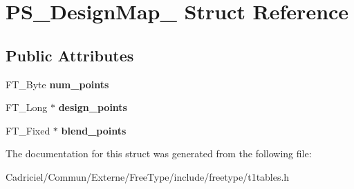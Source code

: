 \hypertarget{struct_p_s___design_map__}{\section{P\-S\-\_\-\-Design\-Map\-\_\- Struct Reference}
\label{struct_p_s___design_map__}
}
\subsection*{Public Attributes}
\begin{DoxyCompactItemize}
\item 
\hypertarget{struct_p_s___design_map___a505a70dd0f497f177fffca9bc4e5d0a5}{F\-T\-\_\-\-Byte {\bfseries num\-\_\-points}}\label{struct_p_s___design_map___a505a70dd0f497f177fffca9bc4e5d0a5}

\item 
\hypertarget{struct_p_s___design_map___abd7a86ba33248ceed657c31063b49679}{F\-T\-\_\-\-Long $\ast$ {\bfseries design\-\_\-points}}\label{struct_p_s___design_map___abd7a86ba33248ceed657c31063b49679}

\item 
\hypertarget{struct_p_s___design_map___a74a555fb4315fca7477f6d20d49686ec}{F\-T\-\_\-\-Fixed $\ast$ {\bfseries blend\-\_\-points}}\label{struct_p_s___design_map___a74a555fb4315fca7477f6d20d49686ec}

\end{DoxyCompactItemize}


The documentation for this struct was generated from the following file\-:\begin{DoxyCompactItemize}
\item 
Cadriciel/\-Commun/\-Externe/\-Free\-Type/include/freetype/t1tables.\-h\end{DoxyCompactItemize}

